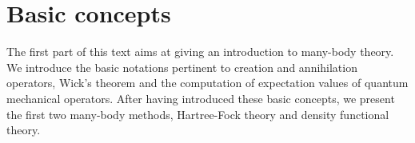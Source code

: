 % 
%
%

\part{Basic concepts}
The first part of this text aims at giving an introduction to many-body theory. We introduce the basic notations pertinent to creation and annihilation operators, Wick's theorem and the computation of expectation values of quantum mechanical operators. 
After having introduced these basic concepts, we present the first two many-body methods, Hartree-Fock theory and density functional theory.
